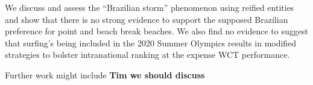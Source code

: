 \documentclass{article}
\begin{document}
We discuss and assess the ``Brazilian storm'' phenomenon using reified
entities and show that there is no strong evidence to support the
supposed Brazilian preference for point and beach break beaches.  We
also find no evidence to suggest that surfing's being included in the
2020 Summer Olympics results in modified strategies to bolster
intranational ranking at the expense WCT performance.

Further work might include  {\bf\large Tim we should discuss}



\end{document}

